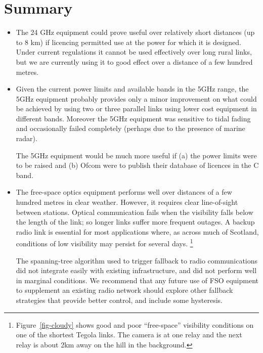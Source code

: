 \documentclass{amsart}
\begin{document}
\section{Summary}

\begin{itemize}
\item The 24 GHz equipment could prove useful over relatively short
distances (up to 8 km) if licencing permitted use at the power for
which it is designed. Under current regulations it cannot be used effectively over long
 rural links, but we are currently using it to good effect over a
 distance of a few hundred metres.

\item Given the current power limits and available bands in the 
5GHz range, the 5GHz equipment probably provides only a minor
improvement on what could be achieved by using two or three parallel
links using lower cost equipment in different bands.  Moreover the 5GHz equipment
was sensitive to tidal fading and occasionally failed completely (perhaps
due to the presence of marine radar).

The 5GHz
equipment would be much more useful if (a)  the power limits were to
be raised and (b) Ofcom were to publish their database of licences in
the C band. 

\item The free-space optics equipment performs well over
  distances of a few hundred metres in clear weather. However, it
  requires clear line-of-sight between stations. Optical
  communication fails when the visibility falls below the length of
  the link; so longer links suffer more frequent outages. 
A backup radio link is essential
  for most applications where, as across much of Scotland, conditions of low visibility may persist
  for several days. 
  \footnote{Figure~\ref{fig-cloudy} shows
    good and poor ``free-space''  visibility
    conditions on one of the shortest Tegola links.  The camera is at one relay
    and the next relay is about 2km away on the hill in the
    background.}  

The spanning-tree algorithm used to trigger fallback to radio
communications did not integrate easily with existing infrastructure,
and did not perform well in marginal conditions. We recommend that any future use of FSO equipment to supplement an
existing radio network should explore other fallback strategies that
provide better control, and include some hysteresis.

\end{itemize}
\end{document}
